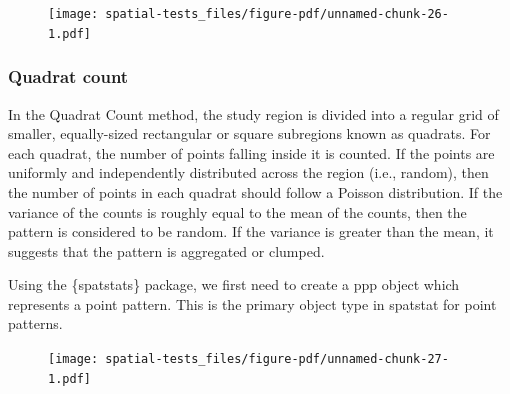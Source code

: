 \documentclass[
  letterpaper,
]{book}
\newenvironment{Shaded}{\begin{snugshade}}{\end{snugshade}}
\newcommand{\CommentTok}[1]{\textcolor[rgb]{0.37,0.37,0.37}{#1}}
\newcommand{\DocumentationTok}[1]{\textcolor[rgb]{0.37,0.37,0.37}{\textit{#1}}}
\newcommand{\FunctionTok}[1]{\textcolor[rgb]{0.28,0.35,0.67}{#1}}
\newcommand{\NormalTok}[1]{\textcolor[rgb]{0.00,0.23,0.31}{#1}}
\newcommand{\OtherTok}[1]{\textcolor[rgb]{0.00,0.23,0.31}{#1}}
\newcommand{\SpecialCharTok}[1]{\textcolor[rgb]{0.37,0.37,0.37}{#1}}
\begin{document}
\begin{figure}[H]

{\centering \texttt{[image: spatial-tests\_files/figure-pdf/unnamed-chunk-26-1.pdf]}

}

\end{figure}

\hypertarget{quadrat-count}{%
\subsubsection{Quadrat count}\label{quadrat-count}}

In the Quadrat Count method, the study region is divided into a regular
grid of smaller, equally-sized rectangular or square subregions known as
quadrats. For each quadrat, the number of points falling inside it is
counted. If the points are uniformly and independently distributed
across the region (i.e., random), then the number of points in each
quadrat should follow a Poisson distribution. If the variance of the
counts is roughly equal to the mean of the counts, then the pattern is
considered to be random. If the variance is greater than the mean, it
suggests that the pattern is aggregated or clumped.

Using the \{spatstats\} package, we first need to create a ppp object
which represents a point pattern. This is the primary object type in
spatstat for point patterns.

\begin{Shaded}
\end{Shaded}

\begin{figure}[H]

{\centering \texttt{[image: spatial-tests\_files/figure-pdf/unnamed-chunk-27-1.pdf]}

}

\end{figure}
\end{document}
